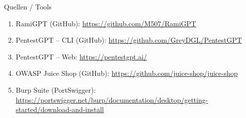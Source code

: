 \documentclass[
	aspectratio=169,	%
	onlytextwidth,		%
	t,					%
	]{beamer}
\begin{document}
\appendix

\begin{frame}{Quellen / Tools}
	\begin{enumerate}
		\item RamiGPT (GitHub):  
		\url{https://github.com/M507/RamiGPT}
		
		\item PentestGPT – CLI (GitHub):  
		\url{https://github.com/GreyDGL/PentestGPT}
		
		\item PentestGPT – Web:  
		\url{https://pentestgpt.ai/}
		
		\item OWASP Juice Shop (GitHub):  
		\url{https://github.com/juice-shop/juice-shop}
		
		\item Burp Suite (PortSwigger):  
		\url{https://portswigger.net/burp/documentation/desktop/getting-started/download-and-install}
	\end{enumerate}
\end{frame}



	
	\makethankyou
%
%
\end{document}
